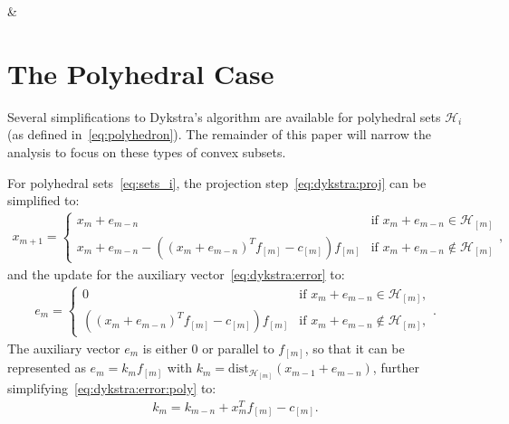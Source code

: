 &\section{The Polyhedral Case}
\label{sec:polyhedral_case}
Several simplifications to Dykstra's algorithm are available for polyhedral sets $\mathcal{H}_i$ (as defined in~\eqref{eq:polyhedron}). The remainder of this paper will narrow the analysis to focus on these types of convex subsets.

For polyhedral sets~\eqref{eq:sets_i}, the projection step~\eqref{eq:dykstra:proj} can be simplified to:
\begin{align}\label{eq:dykstra:proj:poly}
x_{m+1}=
\begin{cases}
x_{m}+e_{m-n} & \text{if } x_{m}+e_{m-n}\in\mathcal{H}_{[m]}\\
x_{m}+e_{m-n} - \left((x_{m}+e_{m-n})^T f_{[m]} - c_{[m]}\right) f_{[m]} & \text{if } x_{m}+e_{m-n}\not\in\mathcal{H}_{[m]}
\end{cases},
\end{align}
and the update for the auxiliary vector~\eqref{eq:dykstra:error} to:
\begin{align}\label{eq:dykstra:error:poly}
e_m=
\begin{cases}
0 & \text{if } x_{m}+e_{m-n}\in\mathcal{H}_{[m]},\\
\left((x_{m}+e_{m-n})^T f_{[m]} - c_{[m]}\right) f_{[m]} & \text{if } x_{m}+e_{m-n}\not\in\mathcal{H}_{[m]},
\end{cases}.
\end{align}
The auxiliary vector $e_m$ is either $0$ or parallel to $f_{[m]}$, so that it can be represented as $e_m = k_m f_{[m]}$ with $k_m=\text{dist}_{\mathcal{H}_{[m]}}(x_{m-1}+e_{m-n})$, further simplifying~\eqref{eq:dykstra:error:poly} to:
\begin{align}\label{eq:km}
k_m = k_{m-n} + x_m^T f_{[m]} - c_{[m]}.
\end{align}

